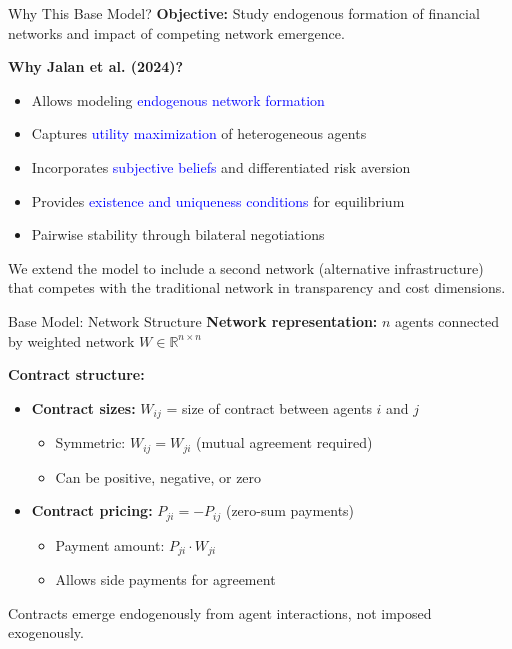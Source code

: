 \documentclass[aspectratio=169]{beamer}
\begin{document}
\begin{frame}{Why This Base Model?}
\textbf{Objective:} Study endogenous formation of financial networks and impact of competing network emergence.

\vspace{0.5cm}
\textbf{Why Jalan et al. (2024)?}
\begin{itemize}
    \item Allows modeling \textcolor{blue}{endogenous network formation}
    \item Captures \textcolor{blue}{utility maximization} of heterogeneous agents
    \item Incorporates \textcolor{blue}{subjective beliefs} and differentiated risk aversion
    \item Provides \textcolor{blue}{existence and uniqueness conditions} for equilibrium
    \item Pairwise stability through bilateral negotiations
\end{itemize}

\vspace{0.3cm}
We extend the model to include a second network (alternative infrastructure) that competes with the traditional network in transparency and cost dimensions.
\end{frame}

\begin{frame}{Base Model: Network Structure}
\textbf{Network representation:} $n$ agents connected by weighted network $W\in\mathbb{R}^{n\times n}$

\vspace{0.3cm}
\textbf{Contract structure:}
\begin{itemize}
    \item \textbf{Contract sizes:} $W_{ij}$ = size of contract between agents $i$ and $j$
    \begin{itemize}
        \item Symmetric: $W_{ij} = W_{ji}$ (mutual agreement required)
        \item Can be positive, negative, or zero
    \end{itemize}
    
    \item \textbf{Contract pricing:} $P_{ji} = -P_{ij}$ (zero-sum payments)
    \begin{itemize}
        \item Payment amount: $P_{ji} \cdot W_{ji}$
        \item Allows side payments for agreement
    \end{itemize}
\end{itemize}

\vspace{0.3cm}
Contracts emerge endogenously from agent interactions, not imposed exogenously.

\end{frame}
\end{document}
